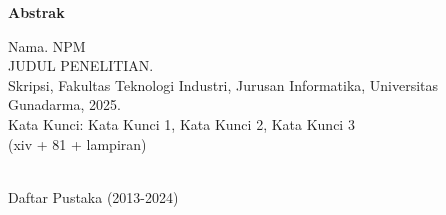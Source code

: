 \newpage %
\begin{center}
\vspace{10mm}
\begin{large}\textbf{Abstrak}\end{large}
\end{center}

\noindent
Nama. NPM \\
JUDUL PENELITIAN. \\
Skripsi, Fakultas Teknologi Industri, Jurusan Informatika, Universitas Gunadarma, 2025. \\
Kata Kunci: Kata Kunci 1, Kata Kunci 2, Kata Kunci 3
\\
(xiv + 81 + lampiran) \\

\vspace{2mm}

\begin{singlespacing}
\lipsum[1]

\end{singlespacing}
\noindent \\
\noindent Daftar Pustaka (2013-2024)